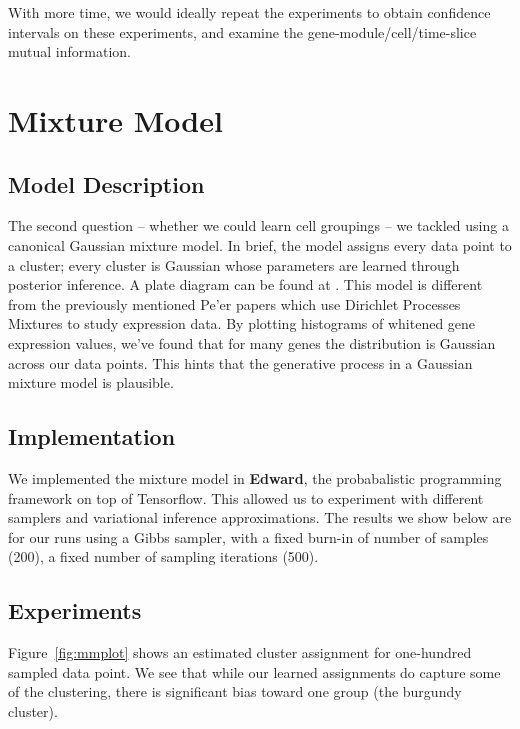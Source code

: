 \documentclass{article}
\begin{document}
With more time, we would ideally repeat the experiments to obtain confidence intervals on these experiments, and examine the gene-module/cell/time-slice mutual information.

\section{Mixture Model} 
\label{mmsec}
\subsection{Model Description} 
The second question -- whether we could learn cell groupings -- we tackled using a canonical Gaussian mixture model. In brief, the model assigns every data point to a cluster; every cluster is Gaussian whose parameters are learned through posterior inference. A plate diagram can be found at \cite{mmplate}. This model is different from the previously mentioned Pe'er papers which use Dirichlet Processes Mixtures to study expression data. By plotting 
histograms of whitened gene expression values, we've found that for many genes the distribution is Gaussian across our data points. This hints that the generative process in a Gaussian mixture model is plausible.

\subsection{Implementation} 
We implemented the mixture model in \textbf{Edward}, the probabalistic programming framework on top of Tensorflow. This allowed us to experiment with different samplers and variational inference approximations. The results we show below are for our runs using a Gibbs sampler, with a fixed burn-in of number of samples (200), a fixed number of sampling iterations (500).

\subsection{Experiments}  

Figure~\ref{fig:mmplot} shows an estimated cluster assignment for one-hundred sampled data point. We see that while our learned assignments do capture some of the clustering, there is significant bias toward one group (the burgundy cluster).
\end{document}
